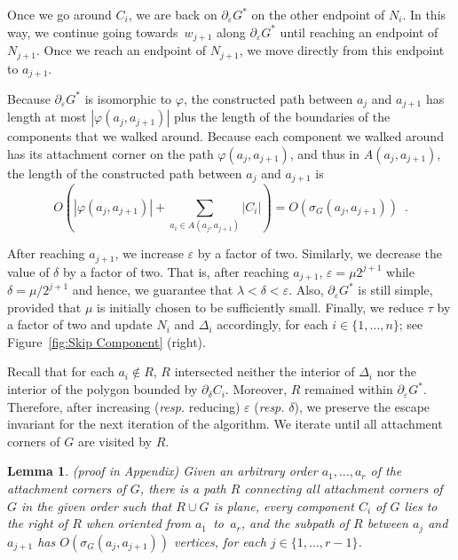 \documentclass{patmorin}
\newcommand{\appendixproof}{(proof in Appendix)\xspace}
\newtheorem{lemma}[theorem]{Lemma}
\begin{document}
Once we go around $C_i$, we are back on $\partial_\varepsilon G^*$ on the other endpoint of $N_i$. In this way, we continue going towards~$w_{j+1}$ along $\partial_\varepsilon G^*$ until reaching an endpoint of $N_{j+1}$.
Once we reach an endpoint of $N_{j+1}$, we move directly from this endpoint to $a_{j+1}$.

Because $\partial_\varepsilon G^*$ is isomorphic to $\varphi$, the constructed path between $a_j$ and $a_{j+1}$ has length at most $|\varphi(a_j, a_{j+1})|$ plus the length of the boundaries of the components that we walked around. Because each component we walked around has its attachment corner on the path $\varphi(a_j, a_{j+1})$, and thus in $A(a_j, a_{j+1})$, the length of the constructed path between $a_j$ and $a_{j+1}$ is
\[ O\left(|\varphi(a_j, a_{j+1})| + \sum_{a_i\in A(a_j, a_{j+1})} |C_i|\right) = O(\sigma_G(a_j, a_{j+1})) \enspace .
\]

After reaching $a_{j+1}$, we increase $\varepsilon$ by a factor of two. Similarly, we decrease the value of $\delta$ by a factor of two. That is, after reaching $a_{j+1}$, $\varepsilon = \mu 2^{j+1}$ while $\delta = \mu/2^{j+1}$ and hence, we guarantee that $\lambda < \delta < \varepsilon$.
Also, $\partial_\varepsilon G^*$ is still simple, provided that $\mu$ is initially chosen to be sufficiently small.
Finally, we reduce $\tau$ by a factor of two and update $N_i$ and $\Delta_i$ accordingly, for each $i\in \{1,\dots,n\}$; see Figure~\ref{fig:Skip Component} (right).

Recall that for each $a_i\notin R$, $R$ intersected neither the interior of $\Delta_i$ nor the interior of the polygon bounded by $\partial_\delta C_i$. Moreover, $R$ remained within $\partial_\varepsilon G^*$.
Therefore, after increasing (\emph{resp.} reducing) $\varepsilon$ (\emph{resp.} $\delta$), we preserve the escape invariant for the next iteration of the algorithm.
We iterate until all attachment corners of $G$ are visited by $R$.

\begin{lemma}\label{lemma:Path for connected augmentations} \appendixproof
Given an arbitrary order $a_1, \ldots, a_r$ of the attachment corners of $G$, there is a path $R$ connecting all attachment corners of $G$ in the given order such that $R\cup G$ is plane, every component $C_i$ of $G$ lies to the right of $R$ when oriented from $a_1$~to~$a_r$, and the subpath of $R$ between $a_j$ and $a_{j+1}$ has $O(\sigma_G(a_j, a_{j+1}))$ vertices, for each $j\in \{1,\dots,r-1\}$.
\end{lemma}
\end{document}

